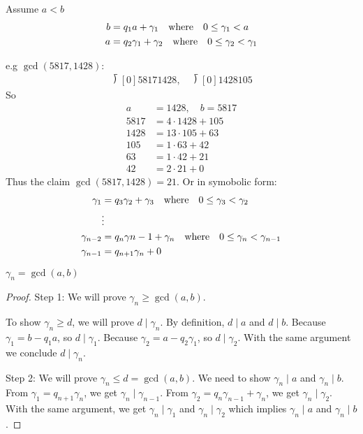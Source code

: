 \documentclass[../main.tex]{subfiles}
\begin{document}
Assume $a < b$
\begin{align*}
    b &= q_1 a + \gamma_1 \qqtext{where} 0 \leq \gamma_1 < a \\
    a &= q_2 \gamma_1 + \gamma_2 \qqtext{where} 0 \leq \gamma_2 < \gamma_1 \\
\end{align*}

e.g $\gcd(5817, 1428)$:
\begin{align*}
    \longdivision[0]{5817}{1428}, \quad \longdivision[0]{1428}{105}
\end{align*}
So
\begin{align*}
    a &= 1428, \quad b = 5817 \\
    5817 &= 4 \cdot 1428 + 105 \\
    1428 &= 13 \cdot 105 + 63 \\
    105 &= 1 \cdot 63 + 42 \\
    63 &= 1 \cdot 42 + 21 \\
    42 &= 2 \cdot 21 + 0
\end{align*}
Thus the claim $\gcd(5817, 1428) = 21$. Or in symobolic form:
\begin{align*}
    \gamma_1 &= q_3 \gamma_2 + \gamma_3 \qqtext{where} 0 \leq \gamma_3 < \gamma_2 \\
    &\vdots \\
    \gamma_{n -2} &= q_n \gamma{n - 1} + \gamma_n \qqtext{where} 0 \leq \gamma_n < \gamma_{n - 1} \\
    \gamma_{n-1} &= q_{n + 1} \gamma_n + 0
\end{align*}

\begin{theorem}
    $\gamma_n = \gcd(a,b)$
\end{theorem}

\begin{proof}
    Step 1: We will prove $\gamma_n \geq \gcd(a,b)$.

    To show $\gamma_n \geq d$, we will prove $d \mid \gamma_n$. By definition,
    $d \mid a$ and $d \mid b$. Because $\gamma_1 = b - q_1 a$, so $d \mid \gamma_1$.
    Because $\gamma_2 = a - q_2 \gamma_1$, so $d \mid \gamma_2$. With the same argument we conclude
    $d \mid \gamma_n$.

    Step 2: We will prove $\gamma_n \leq d = \gcd(a,b)$. We need to show $\gamma_n \mid a$ and 
    $\gamma_n \mid b$. From $\gamma_1 = q_{n+1} \gamma_n$, we get $\gamma_n \mid \gamma_{n-1}$.
    From $\gamma_2 = q_n \gamma_{n - 1} + \gamma_n$, we get $\gamma_n \mid \gamma_2$. With the same
    argument, we get $\gamma_n \mid \gamma_1$ and $\gamma_n \mid \gamma_2$ which implies
    $\gamma_n \mid a$ and $\gamma_n \mid b$.
\end{proof}
\end{document}

